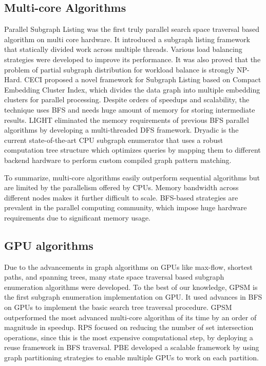 \subsection{Multi-core Algorithms} \label{sec:lit-par}
Parallel Subgraph Listing \cite{psgl} was the first truly parallel search space traversal based algorithm on multi core hardware. It introduced a subgraph listing framework that statically divided work across multiple threads.
Various load balancing strategies were developed to improve its performance. It was also proved that the problem of partial subgraph distribution for workload balance is strongly NP-Hard.
CECI \cite{CECI} proposed a novel framework for Subgraph Listing based on Compact Embedding Cluster Index, which divides the data graph into multiple embedding clusters for parallel processing.
Despite orders of speedups and scalability, the technique uses BFS and needs huge amount of memory for storing intermediate results.
LIGHT \cite{LIGHT} eliminated the memory requirements of previous BFS parallel algorithms by developing a multi-threaded DFS framework.
Dryadic \cite{Dryadic} is the current state-of-the-art CPU subgraph enumerator that uses a robust computation tree structure which optimizes queries by mapping them to different backend hardware to perform custom compiled graph pattern matching.

To summarize, multi-core algorithms easily outperform  sequential algorithms but are limited by the parallelism offered by CPUs.
Memory bandwidth across different nodes makes it further difficult to scale.
BFS-based strategies are prevalent in the parallel computing community, which impose huge hardware requirements due to significant memory usage.

\subsection{GPU algorithms} \label{sec:lit-gpu}
Due to the advancements in graph algorithms on GPUs like max-flow, shortest paths, and spanning trees, many state space traversal based subgraph enumeration algorithms were developed.
To the best of our knowledge, GPSM \cite{GPSM} is the first subgraph enumeration implementation on GPU.
It used advances in BFS on GPUs to implement the basic search tree traversal procedure.
GPSM outperformed the most advanced multi-core algorithm of its time by an order of magnitude in speedup.
RPS \cite{RPS-paper} focused on reducing the number of set intersection operations, since this is the most expensive computational step, by deploying a reuse framework in BFS traversal.
PBE \cite{PBE-paper} developed a scalable framework by using graph partitioning strategies to enable multiple GPUs to work on each partition.

